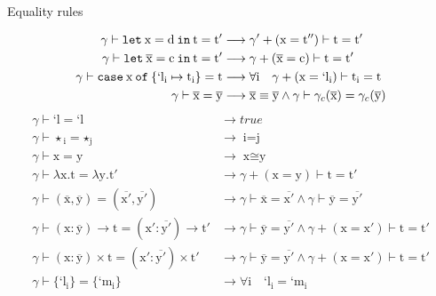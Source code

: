 \documentclass[xcolor=svgnames,11pt]{beamer}
\begin{document}
\begin{frame}[plain]{Equality rules}
\tiny

\begin{align*}\ensuremath{\gamma{{}}\vdash{}\text{\texttt{let}}\:\text{x}=\text{d}\:\text{\texttt{in}}\:\text{t}=\text{t}'}&\longrightarrow{} \ensuremath{\gamma'{{}}+(\text{x}=\text{t}'')\vdash{}\text{t}=\text{t}'}\\\ensuremath{\gamma{{}}\vdash{}\text{\texttt{let}}\:\overline{\text{x}}=\text{c}\:\text{\texttt{in}}\:\text{t}=\text{t}'}&\longrightarrow{} \ensuremath{\gamma{{}}+(\overline{\text{x}}=\text{c})\vdash{}\text{t}=\text{t}'}\\\ensuremath{\gamma{{}}\vdash{}\text{\texttt{case}}\:\text{x}\:\text{\texttt{of}}\:\{\text{\ensuremath{\text{`l}_{\text{i}}\mapsto{}\text{t}_{\text{i}}}}\}=\text{t}}&\longrightarrow{} \ensuremath{\forall{{}}} \ensuremath{\text{i}} \quad{} \ensuremath{\gamma{{}}+(\text{x}=\text{`l}_{\text{i}})\vdash{}\text{t}_{\text{i}}=\text{t}}\\\ensuremath{\gamma{{}}\vdash{}\overline{\text{x}}=\overline{\text{y}}}&\longrightarrow{} \ensuremath{\overline{\text{x}}\equiv{}\overline{\text{y}}\land\gamma{{}}\vdash{}\gamma_c{{}}{}(\overline{\text{x}})=\gamma_c{{}}{}(\overline{\text{y}})}\end{align*}
\begin{align*}\ensuremath{\gamma{{}}\vdash{}\text{`l}=\text{`l}}&\longrightarrow{} true\\\ensuremath{\gamma{{}}\vdash{}\star{}_{\text{i}}=\star{}_{\text{j}}}&\longrightarrow{} \ensuremath{\text{i}=\text{j}}\\\ensuremath{\gamma{{}}\vdash{}\text{x}=\text{y}}&\longrightarrow{} \ensuremath{\text{x}\cong{}\text{y}}\\\ensuremath{\gamma{{}}\vdash{}\lambda{{}}{}\text{x}.\text{t}=\lambda{{}}{}\text{y}.\text{t}'}&\longrightarrow{} \ensuremath{\gamma{{}}+(\text{x}=\text{y})\vdash{}\text{t}=\text{t}'}\\\ensuremath{\gamma{{}}\vdash{}(\overline{\text{x}},\overline{\text{y}})=(\overline{\text{x}'},\overline{\text{y}'})}&\longrightarrow{} \ensuremath{\gamma{{}}\vdash{}\overline{\text{x}}=\overline{\text{x}'}\land\gamma{{}}\vdash{}\overline{\text{y}}=\overline{\text{y}'}} \\\ensuremath{\gamma{{}}\vdash{}(\text{x}:\overline{\text{y}})\to{}\text{t}=(\text{x}':\overline{\text{y}'})\to{}\text{t}'}&\longrightarrow{} \ensuremath{\gamma{{}}\vdash{}\overline{\text{y}}=\overline{\text{y}'}\land\gamma{{}}+(\text{x}=\text{x}')\vdash{}\text{t}=\text{t}'} \\\ensuremath{\gamma{{}}\vdash{}(\text{x}:\overline{\text{y}})\times{}\text{t}=(\text{x}':\overline{\text{y}'})\times{}\text{t}'}&\longrightarrow{} \ensuremath{\gamma{{}}\vdash{}\overline{\text{y}}=\overline{\text{y}'}\land\gamma{{}}+(\text{x}=\text{x}')\vdash{}\text{t}=\text{t}'} \\\ensuremath{\gamma{{}}\vdash{}\{\text{`l}_{\text{i}}\}=\{\text{`m}_{\text{i}}\}}&\longrightarrow{} \ensuremath{\forall{{}}} \ensuremath{\text{i}} \quad{} \ensuremath{\text{`l}_{\text{i}}=\text{`m}_{\text{i}}}\end{align*}

\end{frame}
\end{document}
